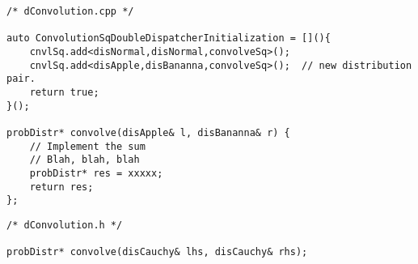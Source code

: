 \begin{verbatim}
/* dConvolution.cpp */

auto ConvolutionSqDoubleDispatcherInitialization = [](){
    cnvlSq.add<disNormal,disNormal,convolveSq>();
    cnvlSq.add<disApple,disBananna,convolveSq>();  // new distribution pair.
    return true;
}();

probDistr* convolve(disApple& l, disBananna& r) {
    // Implement the sum
    // Blah, blah, blah 
    probDistr* res = xxxxx;
    return res;
};
\end{verbatim}


\begin{verbatim}
/* dConvolution.h */

probDistr* convolve(disCauchy& lhs, disCauchy& rhs);
\end{verbatim}